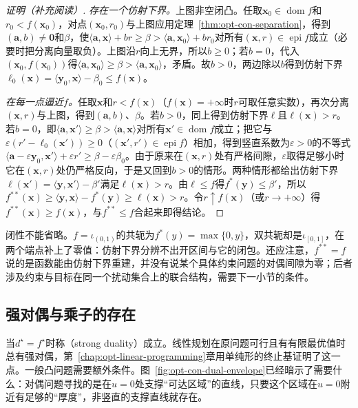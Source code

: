 \begin{proof}[证明（补充阅读）]
\emph{存在一个仿射下界。}上图非空闭凸。任取$\bm x_0\in\operatorname{dom}f$和$r_0<f(\bm x_0)$，对点$(\bm x_0,r_0)$与上图应用定理~\ref{thm:opt-con-separation}，得到$(\bm a,b)\neq\bm0$和$\beta$，使$\langle\bm a,\bm x\rangle+br\geq\beta>\langle\bm a,\bm x_0\rangle+br_0$对所有$(\bm x,r)\in\operatorname{epi}f$成立（必要时把分离向量取负）。上图沿$r$向上无界，所以$b\geq0$；若$b=0$，代入$(\bm x_0,f(\bm x_0))$得$\langle\bm a,\bm x_0\rangle\geq\beta>\langle\bm a,\bm x_0\rangle$，矛盾。故$b>0$，两边除以$b$得到仿射下界$\ell_0(\bm x)=\langle\bm y_0,\bm x\rangle-\beta_0\leq f(\bm x)$。

\emph{在每一点逼近$f$。}任取$\bm x$和$r<f(\bm x)$（$f(\bm x)=+\infty$时$r$可取任意实数），再次分离$(\bm x,r)$与上图，得到$(\bm a,b)$、$\beta$。若$b>0$，同上得到仿射下界$\ell$且$\ell(\bm x)>r$。若$b=0$，即$\langle\bm a,\bm x'\rangle\geq\beta>\langle\bm a,\bm x\rangle$对所有$\bm x'\in\operatorname{dom}f$成立；把它与$\varepsilon(r'-\ell_0(\bm x'))\geq0$（$(\bm x',r')\in\operatorname{epi}f$）相加，得到竖直系数为$\varepsilon>0$的不等式$\langle\bm a-\varepsilon\bm y_0,\bm x'\rangle+\varepsilon r'\geq\beta-\varepsilon\beta_0$。由于原来在$(\bm x,r)$处有严格间隙，$\varepsilon$取得足够小时它在$(\bm x,r)$处仍严格反向，于是又回到$b>0$的情形。两种情形都给出仿射下界$\ell(\bm x')=\langle\bm y,\bm x'\rangle-\beta'$满足$\ell(\bm x)>r$。由$\ell\leq f$得$f^*(\bm y)\leq\beta'$，所以$f^{**}(\bm x)\geq\langle\bm y,\bm x\rangle-f^*(\bm y)\geq\ell(\bm x)>r$。令$r\uparrow f(\bm x)$（或$r\to+\infty$）得$f^{**}(\bm x)\geq f(\bm x)$，与$f^{**}\leq f$合起来即得结论。
\end{proof}

闭性不能省略。$f=\iota_{(0,1)}$的共轭为$f^*(y)=\max\{0,y\}$，双共轭却是$\iota_{[0,1]}$，在两个端点补上了零值：仿射下界分辨不出开区间与它的闭包。还应注意，$f^{**}=f$说的是函数能由仿射下界重建，并没有说某个具体约束问题的对偶间隙为零；后者涉及约束与目标在同一个扰动集合上的联合结构，需要下一小节的条件。

\subsection{强对偶与乘子的存在}
\label{sec:opt-con-strong-duality}

当$d^\star=f^\star$时称（strong duality）成立。线性规划在原问题可行且有有限最优值时总有强对偶，第~\ref{chap:opt-linear-programming}章用单纯形的终止基证明了这一点。一般凸问题需要额外条件。图~\ref{fig:opt-con-dual-envelope}已经暗示了需要什么：对偶问题寻找的是在$u=0$处支撑“可达区域”的直线，只要这个区域在$u=0$附近有足够的“厚度”，非竖直的支撑直线就存在。

